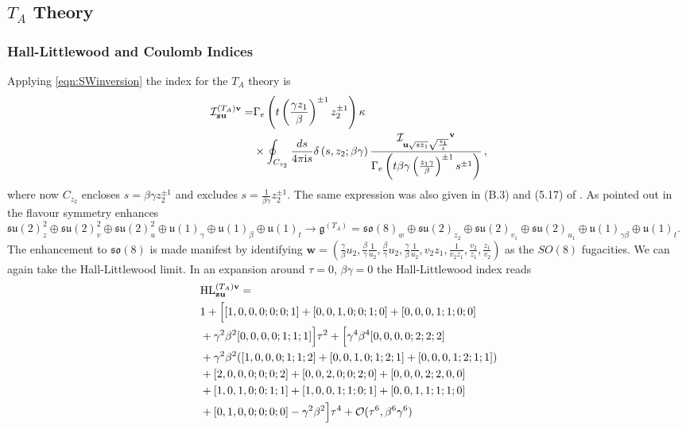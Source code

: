 \documentclass[main.tex]{subfiles}
\begin{document}
\subsection{\texorpdfstring{$T_A$}{TA} Theory}
\subsubsection{Hall-Littlewood and Coulomb Indices}
Applying \eqref{eqn:SWinversion} the index for the $T_A$ theory is
\begin{equation}\label{eqn:TAindex}
\begin{aligned}
 \mathcal{I} ^{(T_A)\mathbf{v}}_{\mathbf{z}\mathbf{u}}=&\Gamma_e\left(t \left(\frac{\gamma z_1}{\beta}\right)^{\pm1}z_2^{\pm1}\right)\kappa\\
 &\times\oint_{C_{z_2}}\frac{ds}{4\pi\iu s}\delta\left(s,z_2;\beta\gamma\right)\frac{ \mathcal{I} \indices{_{\mathbf{u}\sqrt{sz_1}\sqrt{\frac{z_1}{s}}}^{\mathbf{v}}}}{\Gamma_e\left(t\beta\gamma\left(\frac{z_1\gamma}{\beta}\right)^{\pm1}s^{\pm1}\right)}\,,
 \end{aligned}
\end{equation}
where now $C_{z_2}$ encloses $s=\beta\gamma z_2^{\pm1}$ and excludes $s=\frac{1}{\beta\gamma}z_2^{\pm1}$.
The same expression was also given in (B.3) and (5.17) of \cite{Razamat:2016dpl}. As pointed out in \cite{Razamat:2016dpl} the flavour symmetry enhances $\mathfrak{su}(2)^2_{z}\oplus \mathfrak{su}(2)^2_{v}\oplus \mathfrak{su}(2)^2_{u}\oplus \mathfrak{u}(1)_{\gamma}\oplus \mathfrak{u}(1)_{\beta}\oplus \mathfrak{u}(1)_{t}\to \mathfrak{g}^{(T_A)}=\mathfrak{so}(8)_{w}\oplus \mathfrak{su}(2)_{z_2}\oplus \mathfrak{su}(2)_{v_1}\oplus \mathfrak{su}(2)_{u_1}\oplus \mathfrak{u}(1)_{\gamma\beta}\oplus \mathfrak{u}(1)_{t}$. The enhancement to $\mathfrak{so}(8)$ is made manifest by identifying $\mathbf{w}=(\frac{\gamma}{\beta}u_2 , \frac{\beta}{\gamma}\frac{1}{u_2}, \frac{\beta}{\gamma}u_2 , \frac{\gamma}{\beta}\frac{1}{u_2} , v_2z_1, \frac{1}{v_2z_1}, \frac{v_2}{z_1},\frac{z_1}{v_2})$ as the $SO(8)$ fugacities. We can again take the Hall-Littlewood limit. 
In an expansion around $\tau=0$, $\beta\gamma=0$ the Hall-Littlewood index reads
\begin{equation}
\begin{aligned}\label{eqn:HLTA}
&\textrm{HL}^{(T_A)\mathbf{v}}_{\mathbf{z}\mathbf{u}}=\\
&1+\Big[[1,0,0,0;0;0;1]+[0,0,1,0;0;1;0]+[0,0,0,1;1;0;0]\\
&+\gamma^2\beta^2[0,0,0,0;1;1;1]\Big]\tau^2+\Big[\gamma^4\beta^4[0,0,0,0;2;2;2]\\
&+\gamma^2\beta^2([1,0,0,0;1;1;2]+[0,0,1,0;1;2;1]+[0,0,0,1;2;1;1])\\
&+[2,0,0,0;0;0;2]+[0,0,2,0;0;2;0]+[0,0,0,2;2,0,0]\\
&+[1,0,1,0;0;1;1]+[1,0,0,1;1;0;1]+[0,0,1,1;1;1;0]\\
&+[0,1,0,0;0;0;0]-\gamma^2\beta^2\Big]\tau^4+\mathcal{O}(\tau^6,\beta^6\gamma^6)
\end{aligned}
\end{equation} 
\end{document}
